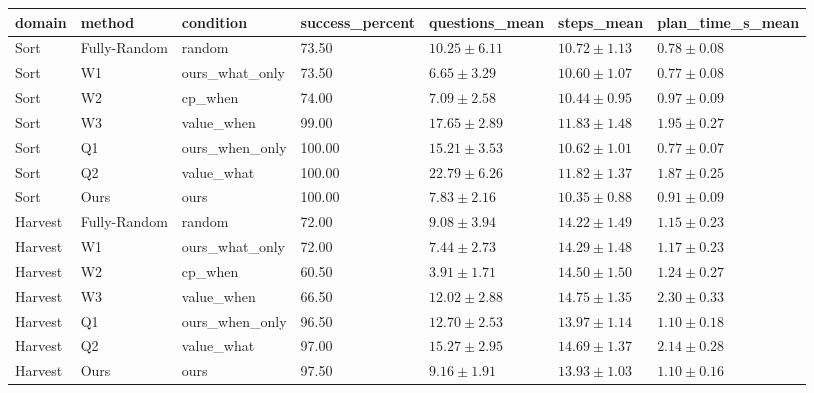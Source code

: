 \begin{tabular}{lllllll}
\hline
domain & method & condition & success\_percent & questions\_mean & steps\_mean & plan\_time\_s\_mean \\
\hline
Sort & Fully-Random & random & 73.50 & $10.25 \pm 6.11$ & $10.72 \pm 1.13$ & $0.78 \pm 0.08$ \\
Sort & W1 & ours\_what\_only & 73.50 & $6.65 \pm 3.29$ & $10.60 \pm 1.07$ & $0.77 \pm 0.08$ \\
Sort & W2 & cp\_when & 74.00 & $7.09 \pm 2.58$ & $10.44 \pm 0.95$ & $0.97 \pm 0.09$ \\
Sort & W3 & value\_when & 99.00 & $17.65 \pm 2.89$ & $11.83 \pm 1.48$ & $1.95 \pm 0.27$ \\
Sort & Q1 & ours\_when\_only & 100.00 & $15.21 \pm 3.53$ & $10.62 \pm 1.01$ & $0.77 \pm 0.07$ \\
Sort & Q2 & value\_what & 100.00 & $22.79 \pm 6.26$ & $11.82 \pm 1.37$ & $1.87 \pm 0.25$ \\
Sort & Ours & ours & 100.00 & $7.83 \pm 2.16$ & $10.35 \pm 0.88$ & $0.91 \pm 0.09$ \\
Harvest & Fully-Random & random & 72.00 & $9.08 \pm 3.94$ & $14.22 \pm 1.49$ & $1.15 \pm 0.23$ \\
Harvest & W1 & ours\_what\_only & 72.00 & $7.44 \pm 2.73$ & $14.29 \pm 1.48$ & $1.17 \pm 0.23$ \\
Harvest & W2 & cp\_when & 60.50 & $3.91 \pm 1.71$ & $14.50 \pm 1.50$ & $1.24 \pm 0.27$ \\
Harvest & W3 & value\_when & 66.50 & $12.02 \pm 2.88$ & $14.75 \pm 1.35$ & $2.30 \pm 0.33$ \\
Harvest & Q1 & ours\_when\_only & 96.50 & $12.70 \pm 2.53$ & $13.97 \pm 1.14$ & $1.10 \pm 0.18$ \\
Harvest & Q2 & value\_what & 97.00 & $15.27 \pm 2.95$ & $14.69 \pm 1.37$ & $2.14 \pm 0.28$ \\
Harvest & Ours & ours & 97.50 & $9.16 \pm 1.91$ & $13.93 \pm 1.03$ & $1.10 \pm 0.16$ \\
\hline
\end{tabular}
